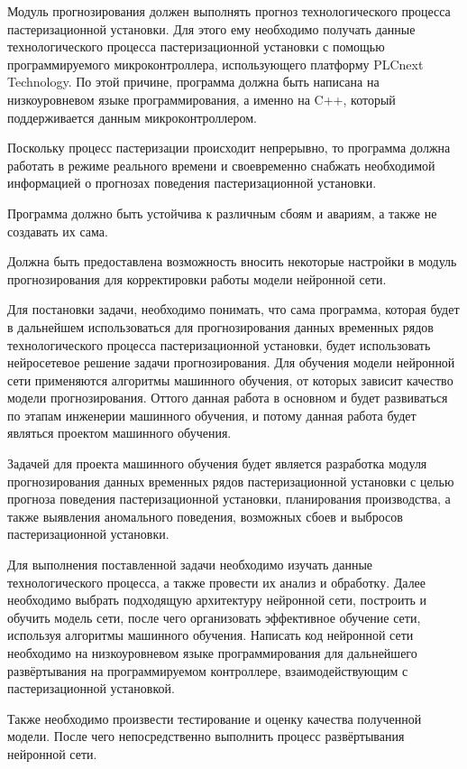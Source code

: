 {\gostFont

  \par \redline Модуль прогнозирования должен выполнять прогноз технологического процесса пастеризационной установки. Для этого ему необходимо получать данные технологического процесса пастеризационной установки с помощью программируемого микроконтроллера, использующего платформу PLCnext Technology. По этой причине, программа должна быть написана на низкоуровневом языке программирования, а именно на C++, который поддерживается данным микроконтроллером. 

  \par \redline Поскольку процесс пастеризации происходит непрерывно, то программа должна работать в режиме реального времени и своевременно снабжать необходимой информацией о прогнозах поведения пастеризационной установки. 

  \par \redline Программа должно быть устойчива к различным сбоям и авариям, а также не создавать их сама. 

  \par \redline Должна быть предоставлена возможность вносить некоторые настройки в модуль прогнозирования для корректировки работы модели нейронной сети. 

  \par \redline Для постановки задачи, необходимо понимать, что сама программа, которая будет в дальнейшем использоваться для прогнозирования данных временных рядов технологического процесса пастеризационной установки, будет использовать нейросетевое решение задачи прогнозирования. Для обучения модели нейронной сети применяются алгоритмы машинного обучения, от которых зависит качество модели прогнозирования. Оттого данная работа в основном и будет развиваться по этапам инженерии машинного обучения, и потому данная работа будет являться проектом машинного обучения. 

  \par \redline Задачей для проекта машинного обучения будет является разработка модуля прогнозирования данных временных рядов пастеризационной установки с целью прогноза поведения пастеризационной установки, планирования производства, а также выявления аномального поведения, возможных сбоев и выбросов пастеризационной установки. 

  \par \redline Для выполнения поставленной задачи необходимо изучать данные технологического процесса, а также провести их анализ и обработку. Далее необходимо выбрать подходящую архитектуру нейронной сети, построить и обучить модель сети, после чего организовать эффективное обучение сети, используя алгоритмы машинного обучения.  Написать код нейронной сети необходимо на низкоуровневом языке программирования для дальнейшего развёртывания на программируемом контроллере, взаимодействующим с пастеризационной установкой. 

  \par \redline Также необходимо произвести тестирование и оценку качества полученной модели. После чего непосредственно выполнить процесс развёртывания нейронной сети.  

  \par 
}

\setcounter{subchaptercntr}{1}
\setcounter{formulacntr}{1}
\setcounter{imagecntr}{1}
\setcounter{tablecntr}{1}


